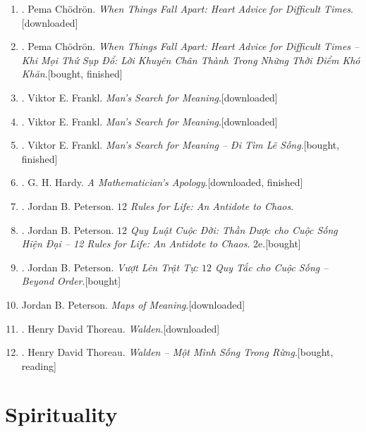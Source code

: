 \documentclass{article}
\begin{document}
\begin{enumerate}
	\item \cite{Chodron2002}. Pema Ch\"odr\"on. \textit{When Things Fall Apart: Heart Advice for Difficult Times}.\hfill\textsf{[downloaded]}
	\item \cite{Chodron2021}. Pema Ch\"odr\"on. \textit{When Things Fall Apart: Heart Advice for Difficult Times -- Khi Mọi Thứ Sụp Đổ: Lời Khuyên Chân Thành Trong Những Thời Điểm Khó Khăn}.\hfill\textsf{[bought, finished]}
	\item \cite{Frankl2013}. Viktor E. Frankl. \textit{Man's Search for Meaning}.\hfill\textsf{[downloaded]}
	\item \cite{Frankl2017}. Viktor E. Frankl. \textit{Man's Search for Meaning}.\hfill\textsf{[downloaded]}
	\item \cite{Frankl2022}. Viktor E. Frankl. \textit{Man's Search for Meaning -- Đi Tìm Lẽ Sống}.\hfill\textsf{[bought, finished]}
	\item \cite{Hardy1940, Hardy1992, Hardy2022}. G. H. Hardy. \textit{A Mathematician's Apology}.\hfill\textsf{[downloaded, finished]}
	\item \cite{Peterson2018}. Jordan B. Peterson. \textit{$12$ Rules for Life: An Antidote to Chaos}.
	\item \cite{Peterson2022a}. Jordan B. Peterson. \textit{$12$ Quy Luật Cuộc Đời: Thần Dược cho Cuộc Sống Hiện Đại -- 12 Rules for Life: An Antidote to Chaos}. 2e.\hfill\textsf{[bought]}
	\item \cite{Peterson2022b}. Jordan B. Peterson. \textit{Vượt Lên Trật Tự: $12$ Quy Tắc cho Cuộc Sống -- Beyond Order}.\hfill\textsf{[bought]}
	\item Jordan B. Peterson. \textit{Maps of Meaning}.\hfill\textsf{[downloaded]}
	\item \cite{Thoreau2014}. Henry David Thoreau. \textit{Walden}.\hfill\textsf{[downloaded]}
	\item \cite{Thoreau2023}. Henry David Thoreau. \textit{Walden -- Một Mình Sống Trong Rừng}.\hfill\textsf{[bought, reading]}
\end{enumerate}


\section{Spirituality}
\end{document}
